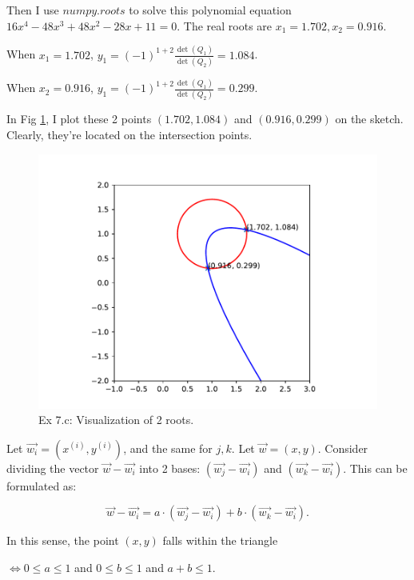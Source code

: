 \documentclass[
  course = {{16-811 Math Fundamentals for Robotics}},
  quartile = {{1}},
  assignment = 2,
  name = {{Kangle Deng}},
  email = {{kangled@andrew.cmu.edu}},
  firstexercise = 1
]{aga-homework}
\begin{document}
Then I use $numpy.roots$ to solve this polynomial equation $16x^4 - 48x^3 + 48x^2 - 28x + 11 = 0$. The real roots are $x_1 = 1.702, x_2 = 0.916$.

When $x_1 = 1.702$, $y_1 = (-1)^{1+2} \frac{\det(Q_1)}{\det(Q_2)} = 1.084$.

When $x_2 = 0.916$, $y_1 = (-1)^{1+2} \frac{\det(Q_1)}{\det(Q_2)} = 0.299$.

\subexercise
In Fig \ref{fig:ex7c}, I plot these 2 points $(1.702, 1.084)$ and $(0.916, 0.299)$ on the sketch. Clearly, they're located on the intersection points.

\begin{figure}
    \centering
    \includegraphics{math/fig/hw2/ex7c.pdf}
    \caption{Ex 7.c: Visualization of 2 roots.}
    \label{fig:ex7c}
\end{figure}

\exercise
\subexercise
Let $\Vec{w_i} = (x^{(i)}, y^{(i)})$, and the same for $j, k$. Let $\Vec{w} = (x, y)$. Consider dividing the vector $\Vec{w} - \Vec{w_i}$ into 2 bases: $(\Vec{w_j} - \Vec{w_i})$ and $(\Vec{w_k} - \Vec{w_i})$. This can be formulated as:

\begin{equation}
    \Vec{w} - \Vec{w_i} = a \cdot (\Vec{w_j} - \Vec{w_i}) + b \cdot (\Vec{w_k} - \Vec{w_i}).
\label{eq:ex8a1} 
\end{equation}

In this sense, the point $(x, y)$ falls within the triangle 

\noindent $\Leftrightarrow 0 \le a \le 1$ and $0 \le b \le 1$ and $a + b \le 1$.
\end{document}
